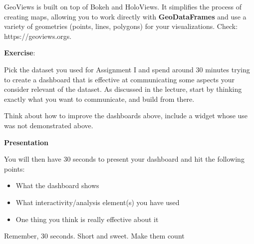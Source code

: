 \documentclass[
  letterpaper,
  DIV=11,
  numbers=noendperiod]{scrreprt}
\providecommand{\tightlist}{%
  \setlength{\itemsep}{0pt}\setlength{\parskip}{0pt}}\usepackage{longtable,booktabs,array}
\begin{document}
GeoViews is built on top of Bokeh and HoloViews. It simplifies the
process of creating maps, allowing you to work directly with
\textbf{GeoDataFrames} and use a variety of geometries (points, lines,
polygons) for your visualizations. Check: https://geoviews.orgs.

\textbf{Exercise}:

Pick the dataset you used for Assignment I and spend around 30 minutes
trying to create a dashboard that is effective at communicating some
aspects your consider relevant of the dataset. As discussed in the
lecture, start by thinking exactly what you want to communicate, and
build from there.

Think about how to improve the dashboards above, include a widget whose
use was not demonstrated above.

\textbf{Presentation}

You will then have 30 seconds to present your dashboard and hit the
following points:

\begin{itemize}
\tightlist
\item
  What the dashboard shows
\item
  What interactivity/analysis element(s) you have used
\item
  One thing you think is really effective about it
\end{itemize}

Remember, 30 seconds. Short and sweet. Make them count
\end{document}
